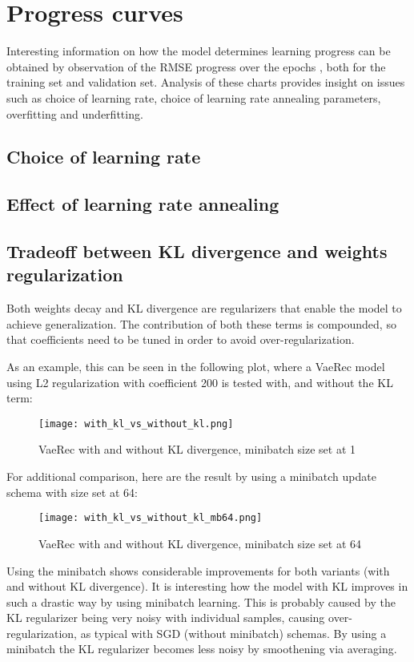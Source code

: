 \section{Progress curves}

Interesting information on how the model determines learning progress
can be obtained by observation of the RMSE progress over the epochs , both for the
training set and validation set. 
Analysis of these charts provides insight on issues such as choice of learning rate,
choice of learning rate annealing parameters, overfitting and underfitting.

\subsection{Choice of learning rate}

\subsection{Effect of learning rate annealing}

\subsection{Tradeoff between KL divergence and weights regularization}

Both weights decay and KL divergence are regularizers that enable the model to achieve
generalization. The contribution of both these terms is compounded, so that 
coefficients need to be tuned in order to avoid over-regularization.

As an example, this can be seen in the following plot, where a VaeRec model
using L2 regularization with coefficient 200 is tested with, and without
the KL term:

\begin{figure}[H]
\texttt{[image: with\_kl\_vs\_without\_kl.png]}
\caption{VaeRec with and without KL divergence, minibatch size set at 1}
\end{figure}

For additional comparison, here are the result by using a minibatch update schema
with size set at 64:

\begin{figure}[H]
\texttt{[image: with\_kl\_vs\_without\_kl\_mb64.png]}
\caption{VaeRec with and without KL divergence, minibatch size set at 64}
\end{figure}

Using the minibatch shows considerable improvements for both variants (with and without KL
divergence).  It is interesting how the model with KL improves in such a drastic way
by using minibatch learning. This is probably caused by the KL regularizer being
very noisy with individual samples, causing over-regularization, as typical with SGD
(without minibatch) schemas. By using a minibatch
the KL regularizer becomes less noisy by smoothening via averaging. 
